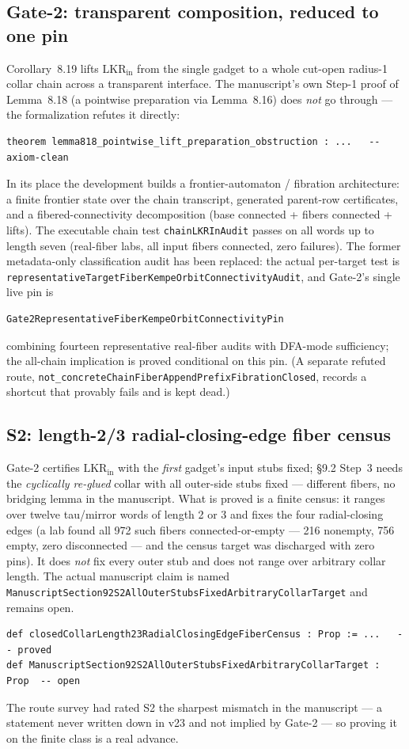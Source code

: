 \documentclass[11pt]{article}
\theoremstyle{definition}
\newcommand{\LKR}{\mathrm{LKR}_{\mathrm{in}}}
\begin{document}
\subsection{Gate-2: transparent composition, reduced to one pin}

Corollary~8.19 lifts $\LKR$ from the single gadget to a whole cut-open radius-1
collar chain across a transparent interface. The manuscript's own Step-1 proof of
Lemma~8.18 (a pointwise preparation via Lemma~8.16) does \emph{not} go through ---
the formalization refutes it directly:
\begin{lstlisting}[language={}]
theorem lemma818_pointwise_lift_preparation_obstruction : ...   -- axiom-clean
\end{lstlisting}
In its place the development builds a frontier-automaton / fibration architecture:
a finite frontier state over the chain transcript, generated parent-row
certificates, and a fibered-connectivity decomposition (base connected + fibers
connected + lifts). The executable chain test \texttt{chainLKRInAudit} passes on
all words up to length seven (real-fiber labs, all input fibers connected, zero
failures). The former metadata-only classification audit has been replaced: the
actual per-target test is
\texttt{representativeTargetFiberKempeOrbitConnectivityAudit}, and Gate-2's
single live pin is
\begin{lstlisting}[language={}]
Gate2RepresentativeFiberKempeOrbitConnectivityPin
\end{lstlisting}
combining fourteen representative real-fiber audits with DFA-mode sufficiency;
the all-chain implication is proved conditional on this pin. (A separate refuted route,
\texttt{not\_concreteChainFiberAppendPrefixFibrationClosed}, records a shortcut
that provably fails and is kept dead.)

\subsection{S2: length-2/3 radial-closing-edge fiber census}

Gate-2 certifies $\LKR$ with the \emph{first} gadget's input stubs fixed;
\S9.2 Step~3 needs the \emph{cyclically re-glued} collar with all outer-side stubs
fixed --- different fibers, no bridging lemma in the manuscript. What is proved
is a finite census: it ranges over twelve tau/mirror words of length 2 or 3 and
fixes the four radial-closing edges (a lab found all 972 such fibers
connected-or-empty --- 216 nonempty, 756 empty, zero disconnected --- and the
census target was discharged with zero pins). It does \emph{not} fix every
outer stub and does not range over arbitrary collar length. The actual
manuscript claim is named
\texttt{ManuscriptSection92S2AllOuterStubsFixedArbitraryCollarTarget} and
remains open.
\begin{lstlisting}[language={}]
def closedCollarLength23RadialClosingEdgeFiberCensus : Prop := ...   -- proved
def ManuscriptSection92S2AllOuterStubsFixedArbitraryCollarTarget : Prop  -- open
\end{lstlisting}
The route survey had rated S2 the sharpest mismatch in the manuscript --- a
statement never written down in v23 and not implied by Gate-2 --- so proving it on
the finite class is a real advance.
\end{document}
